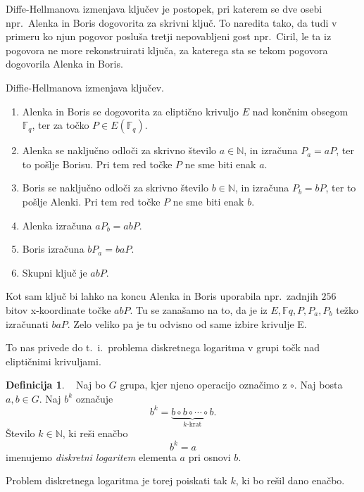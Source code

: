 \documentclass[12pt,a4paper,twoside]{article}
\theoremstyle{definition} %
\newtheorem{definicija}{Definicija}[section]
\theoremstyle{plain} %
\numberwithin{equation}{section}  %
\newcommand{\N}{\mathbb N}
\newcommand{\F}{\mathbb F}
\newcommand{\Fq}[1]{{\mathbb{F}_{#1}}}
\newcommand{\E}[1]{E({#1})}
\begin{document}
Diffe-Hellmanova izmenjava ključev je postopek, pri katerem se dve osebi npr.\  Alenka in Boris dogovorita za skrivni ključ. To naredita tako, da tudi v primeru ko njun pogovor posluša tretji nepovabljeni gost npr.\  Ciril, le ta iz pogovora ne more rekonstruirati ključa, za katerega sta se tekom pogovora dogovorila Alenka in Boris. 
\begin{algorithm}[H]
\caption[Diffe-Hellman]{Diffie-Hellmanova izmenjava ključev.}
\label{alg:diffie-hellman}

\begin{enumerate}

\item Alenka in Boris se dogovorita za eliptično krivuljo $E$ nad končnim obsegom $\Fq{q}$, ter za točko $P \in \E{\Fq{q}}$.
\item Alenka se naključno odloči za skrivno število $a \in \N$, in izračuna $P_a = aP$, ter to pošlje Borisu. Pri tem red točke $P$ ne sme biti enak $a$.
\item Boris se naključno odloči za skrivno število $b \in \N$, in izračuna $P_b = bP$, ter to pošlje Alenki. Pri tem red točke $P$ ne sme biti enak $b$.
\item Alenka izračuna $aP_b=abP$.
\item Boris izračuna $bP_a=baP$.
\item Skupni ključ je $abP$.

\end{enumerate}
\end{algorithm}

Kot sam ključ bi lahko na koncu Alenka in Boris uporabila npr.\  zadnjih $256$ bitov x-koordinate točke $abP$. Tu se zanašamo na to, da je iz $E, \F{q},P, P_a, P_b$ težko izračunati $baP$. Zelo veliko pa je tu odvisno od same izbire krivulje E.

To nas privede do t.\ i.\ problema diskretnega logaritma v grupi točk nad eliptičnimi krivuljami.

\begin{definicija}~
Naj bo $G$ grupa, kjer njeno operacijo označimo z $\circ$.
Naj bosta $a, b \in G$. Naj $b^k$ označuje $$b^k = \underbrace{b\circ b\circ \cdots \circ b}_\text{$k$-krat}.$$ Število $k \in \N$, ki reši enačbo $$b^k = a$$ imenujemo \emph{diskretni logaritem} elementa $a$ pri osnovi $b$.

\end{definicija}

Problem diskretnega logaritma je torej poiskati tak $k$, ki bo rešil dano enačbo.
\end{document}

